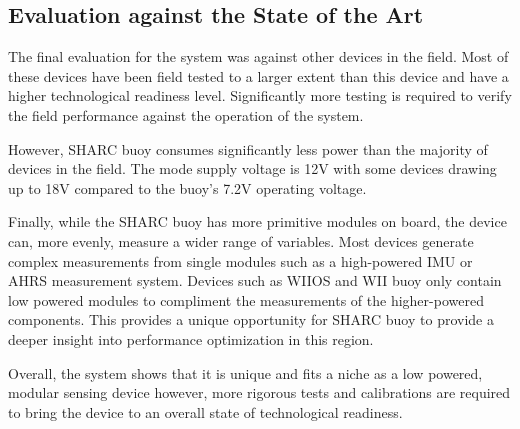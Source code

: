 \subsection{Evaluation against the State of the Art}

The final evaluation for the system was against other devices in the field. Most of these devices have been field tested to a larger extent than this device and have a higher technological readiness level. Significantly more testing is required to verify the field performance against the operation of the system.\par

However, SHARC buoy consumes significantly less power than the majority of devices in the field. The mode supply voltage is 12V with some devices drawing up to 18V compared to the buoy's 7.2V operating voltage.\par 

Finally, while the SHARC buoy has more primitive modules on board, the device can, more evenly, measure a wider range of variables. Most devices generate complex measurements from single modules such as a high-powered IMU or AHRS measurement system. Devices such as WIIOS and WII buoy only contain low powered modules to compliment the measurements of the higher-powered components. This provides a unique opportunity for SHARC buoy to provide a deeper insight into performance optimization in this region.\par 

Overall, the system shows that it is unique and fits a niche as a low powered, modular sensing device however, more rigorous tests and calibrations are required to bring the device to an overall state of technological readiness.
